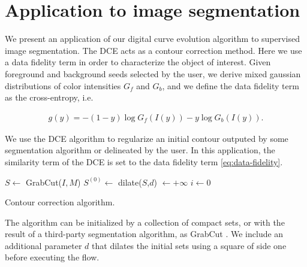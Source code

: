 \documentclass[smallextended]{svjour3}       %
\begin{document}
{{\section{Application to image segmentation}

We present an application of our digital curve evolution algorithm to supervised image segmentation. The DCE acts as a
contour correction method. Here we use a data fidelity term in order to characterize the object of
interest. Given foreground and background seeds selected by the user, we derive mixed gaussian distributions  of color
intensities $G_f$ and $G_b$, and we define the data fidelity term as the cross-entropy, i.e.
	
\begin{align}
  g(y) = -(1-y)\log{G_f(I(y))} - y\log{G_b(I(y))}.
  \label{eq:data-fidelity}
\end{align}	

We use the DCE algorithm to regularize an initial contour outputed by some segmentation algorithm or delineated by the user. In this application, the similarity term of the DCE
is set to the data fidelity term \eqref{eq:data-fidelity}.
	
\begin{algorithm}[H]
 
 \BlankLine

 $S \longleftarrow$ GrabCut($I,M$)\;
 $S^{(0)} \longleftarrow $ dilate($S$,$d$)\; 
 \Delta $\longleftarrow +\infty$\;
 $i \longleftarrow 0$\;
 \label{alg:contour-correction} 
 \caption{Contour correction algorithm.}
\end{algorithm}	

The algorithm can be initialized by a collection of compact sets, or with the result of a third-party segmentation algorithm, as GrabCut \cite{rother04grabcut}. We include an additional parameter $d$ that dilates the initial sets using a square of side one before executing the flow.
	
}}
\end{document}
